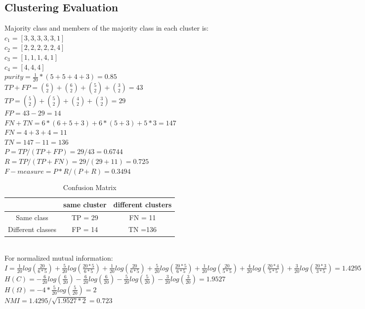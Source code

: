 \documentclass[11pt]{article} %
\begin{document}
\subsection{Clustering Evaluation}
Majority class and members of the majority class in each cluster is:\\
$c_1=[3,3,3,3,3,1]$\\
$c_2=[2,2,2,2,2,4]$\\
$c_3=[1,1,1,4,1]$\\
$c_4=[4,4,4]$\\
$purity = \frac{1}{20}*(5+5+4+3)=0.85$\\
$TP+FP = \binom{6}{2} + \binom{6}{2} + \binom{5}{2} + \binom{3}{2} = 43$\\
$TP = \binom{5}{2} + \binom{5}{2} +\binom{4}{2} +\binom{3}{2} = 29$\\
$FP = 43-29=14$\\
$FN+TN = 6*(6+5+3) + 6*(5+3) + 5*3 = 147$\\
$FN = 4+ 3 + 4 = 11$\\
$TN = 147 - 11 = 136$\\
$P = TP/(TP+FP) = 29/43 = 0.6744$\\
$R = TP/(TP+FN) = 29/(29+11) = 0.725$\\
$F-measure = P*R/(P+R) = 0.3494$
\begin{table}[htdp]
\caption{Confusion Matrix}
\begin{center}
\begin{tabular}{|c|c|c|}
\hline
& same cluster & different clusters \\
\hline
Same class & TP = 29 & FN = 11\\
\hline
Different classes & FP = 14 & TN =136\\
\hline
\end{tabular}
\end{center}
\label{default}
\end{table}%
\\For normalized mutual information:\\
$I = \frac{1}{20}log(\frac{20}{6*5}) +\frac{5}{20}log(\frac{20*5}{6*5})
	+\frac{1}{20}log(\frac{20}{6*5}) +\frac{5}{20}log(\frac{20*5}{6*5})
	+\frac{1}{20}log(\frac{20}{5*5}) +\frac{4}{20}log(\frac{20*4}{5*5})
	+\frac{3}{20}log(\frac{20*3}{3*5})=1.4295$
$H(C) = -\frac{6}{20}log(\frac{6}{20})-\frac{6}{20}log(\frac{6}{20})-\frac{5}{20}log(\frac{5}{20})-\frac{3}{20}log(\frac{3}{20}) = 1.9527$\\
$H(\Omega) = -4*\frac{5}{20}log(\frac{5}{20})= 2$\\
$NMI = 1.4295/\sqrt{1.9527*2} = 0.723$\\
\end{document}
